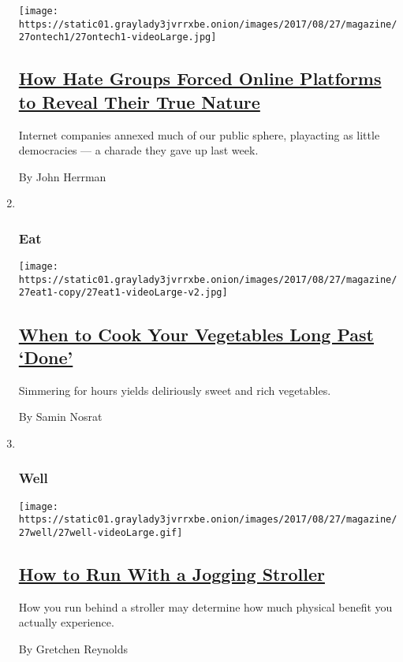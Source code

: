 \begin{enumerate}
  \texttt{[image: https://static01.graylady3jvrrxbe.onion/images/2017/08/27/magazine/27ontech1/27ontech1-videoLarge.jpg]}

  \hypertarget{how-hate-groups-forced-online-platforms-to-reveal-their-true-nature}{%
  \subsection{\texorpdfstring{\href{/2017/08/21/magazine/how-hate-groups-forced-online-platforms-to-reveal-their-true-nature.html}{How
  Hate Groups Forced Online Platforms to Reveal Their True
  Nature}}{How Hate Groups Forced Online Platforms to Reveal Their True Nature}}\label{how-hate-groups-forced-online-platforms-to-reveal-their-true-nature}}

  Internet companies annexed much of our public sphere, playacting as
  little democracies --- a charade they gave up last week.

  By John Herrman
\item ~
  \hypertarget{eat}{%
  \subsubsection{Eat}\label{eat}}

  \texttt{[image: https://static01.graylady3jvrrxbe.onion/images/2017/08/27/magazine/27eat1-copy/27eat1-videoLarge-v2.jpg]}

  \hypertarget{when-to-cook-your-vegetables-long-past-done}{%
  \subsection{\texorpdfstring{\href{/2017/08/23/magazine/when-to-cook-your-vegetables-long-past-done.html}{When
  to Cook Your Vegetables Long Past
  `Done'}}{When to Cook Your Vegetables Long Past `Done'}}\label{when-to-cook-your-vegetables-long-past-done}}

  Simmering for hours yields deliriously sweet and rich vegetables.

  By Samin Nosrat
\item ~
  \hypertarget{well}{%
  \subsubsection{Well}\label{well}}

  \texttt{[image: https://static01.graylady3jvrrxbe.onion/images/2017/08/27/magazine/27well/27well-videoLarge.gif]}

  \hypertarget{how-to-run-with-a-jogging-stroller}{%
  \subsection{\texorpdfstring{\href{/2017/08/24/magazine/how-to-run-with-a-jogging-stroller.html}{How
  to Run With a Jogging
  Stroller}}{How to Run With a Jogging Stroller}}\label{how-to-run-with-a-jogging-stroller}}

  How you run behind a stroller may determine how much physical benefit
  you actually experience.

  By Gretchen Reynolds
\end{enumerate}

